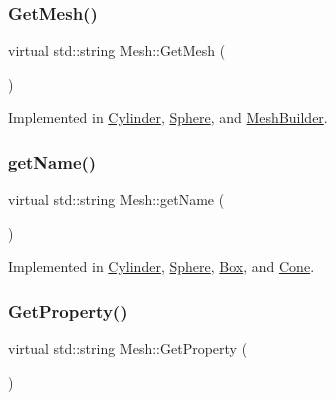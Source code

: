 \subsubsection{\texorpdfstring{GetMesh()}{GetMesh()}}
{\footnotesize\ttfamily virtual std\+::string Mesh\+::\+Get\+Mesh (\begin{DoxyParamCaption}{ }\end{DoxyParamCaption})\hspace{0.3cm}{\ttfamily [pure virtual]}}



Implemented in \mbox{\hyperlink{class_cylinder_adada3adc010fbd6530969b3f7845c727}{Cylinder}}, \mbox{\hyperlink{class_sphere_afd7c86e5319c93163781df0e44cbfd49}{Sphere}}, and \mbox{\hyperlink{class_mesh_builder_a2db99e42ca33437243c6875a85417ef0}{Mesh\+Builder}}.

\mbox{\label{class_mesh_aa131fe1c2586fe60988155db77c57272}} 
\subsubsection{\texorpdfstring{getName()}{getName()}}
{\footnotesize\ttfamily virtual std\+::string Mesh\+::get\+Name (\begin{DoxyParamCaption}{ }\end{DoxyParamCaption})\hspace{0.3cm}{\ttfamily [pure virtual]}}



Implemented in \mbox{\hyperlink{class_cylinder_afdb7f76b3f02471d638c36127395d181}{Cylinder}}, \mbox{\hyperlink{class_sphere_a173e667086ecd8b9d972e1d6f9885d9d}{Sphere}}, \mbox{\hyperlink{class_box_ac8792393d053c6cac65a36e5c1f27f15}{Box}}, and \mbox{\hyperlink{class_cone_a9581010134e3d1fe079fe5cce1933786}{Cone}}.

\mbox{\label{class_mesh_a94464260c2d9ad3c274f72b472fc9a2f}} 
\subsubsection{\texorpdfstring{GetProperty()}{GetProperty()}}
{\footnotesize\ttfamily virtual std\+::string Mesh\+::\+Get\+Property (\begin{DoxyParamCaption}{ }\end{DoxyParamCaption})\hspace{0.3cm}{\ttfamily [pure virtual]}}




